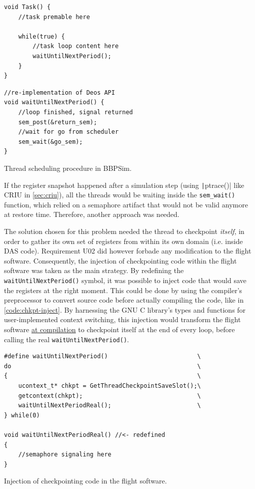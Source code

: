 \begin{listing}[htpb]
	\centering
	\begin{minipage}{.5\textwidth}
	\begin{verbatim}
void Task() {
	//task premable here
	
	while(true) {
		//task loop content here
		waitUntilNextPeriod();
	}
}
	\end{verbatim}
	\end{minipage}%
	\begin{minipage}{.5\textwidth}
	\begin{verbatim}
//re-implementation of Deos API
void waitUntilNextPeriod() {
	//loop finished, signal returned
	sem_post(&return_sem);
	//wait for go from scheduler 
	sem_wait(&go_sem);
}
	\end{verbatim}
	\end{minipage}
	\caption{Thread scheduling procedure in BBPSim.}
	\label{code:thr-sched-bbpsim}
\end{listing}

If the register snapshot happened after a simulation step (using \texttt|ptrace()| like \gls{CRIU} in \autoref{sec:criu}), all the threads would be waiting inside the \texttt{sem_wait()} function, which relied on a semaphore artifact that would not be valid anymore at restore time. Therefore, another approach was needed.

The solution chosen for this problem needed the thread to checkpoint \textit{itself}, in order to gather its own set of registers from within its own domain (i.e. inside DAS code). Requirement U02 did however forbade any modification to the flight software. Consequently, the injection of checkpointing code within the flight software was taken as the main strategy. By redefining the \texttt{waitUntilNextPeriod()} symbol, it was possible to inject code that would save the registers at the right moment. This could be done by using the compiler's preprocessor to convert source code before actually compiling the code, like in \autoref{code:chkpt-inject}. By harnessing the GNU C library's types and functions for user-implemented context switching\cite{online:getcontext}, this injection would transform the flight software \ul{at compilation} to checkpoint itself at the end of every loop, before calling the real \texttt{waitUntilNextPeriod()}. 
\begin{listing}[htpb]
	\centering
	\begin{verbatim}
#define waitUntilNextPeriod()                         \
do                                                    \
{                                                     \
	ucontext_t* chkpt = GetThreadCheckpointSaveSlot();\
	getcontext(chkpt);                                \
	waitUntilNextPeriodReal();                        \ 
} while(0)

void waitUntilNextPeriodReal() //<- redefined
{
	//semaphore signaling here
}
	\end{verbatim}
	\caption{Injection of checkpointing code in the flight software.}
	\label{code:chkpt-inject}
\end{listing}

